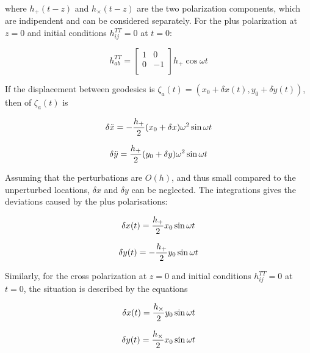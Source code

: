 \documentclass[binding=0.6cm, LaM]{sapthesis}
\begin{document}
	where $h_{+}(t-z)$ and $h_{\times}(t-z)$ are the two polarization components, which are indipendent and can be considered separately.
	For the plus polarization at $z=0$ and initial conditions $h_{ij}^{TT} = 0$ at $t=0$:

		\begin{equation}
		h_{ab}^{TT} = 
		\begin{bmatrix}
		1  & 0 \\
		0 &  -1 \\
		\end{bmatrix} 
		h_{+}\cos \omega t
		\end{equation}

	If the displacement between geodesics is $\zeta_a (t) = (x_0 + \delta x(t), y_0 + \delta y(t))$, then of $\zeta_a (t)$ is

		\begin{equation}
		\delta {\ddot x} = - {{h_{+}} \over 2} (x_0 + \delta x) \omega ^2 \sin \omega t
		\end{equation}

		\begin{equation}
		\delta {\ddot y} =  {{h_{+}} \over 2} (y_0 + \delta y) \omega ^2 \sin \omega t
		\end{equation}

	Assuming that the perturbations are $O(h)$, and thus small compared to the unperturbed locations, $\delta x$ and $\delta y$ can be neglected.
	The integrations gives the deviations caused by the plus polarisations:

		\begin{equation}
		\delta x(t) =  {{h_{+}} \over 2} x_0 \sin \omega t
		\end{equation}

		\begin{equation}
		\delta y(t) = - {{h_{+}} \over 2} y_0  \sin \omega t
		\end{equation}

	Similarly, for the cross polarization at $z=0$ and initial conditions $h_{ij}^{TT} = 0$ at $t= 0$, the situation is described by the equations
		
		\begin{equation}
		\delta x(t) =  {{h_{\times}} \over 2} y_0 \sin \omega t
		\end{equation}

		\begin{equation}
		\delta y(t) =  {{h_{\times}} \over 2} x_0  \sin \omega t
		\end{equation}
		
\end{document}
